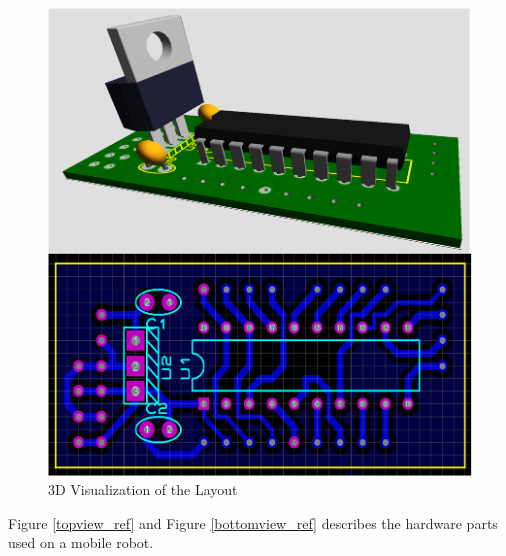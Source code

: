 \begin{figure}[H]
\caption{3D Visualization of the Layout} \label{layout_ref}
\centerline{\includegraphics[scale = 0.60]{sematik-layout}}
\end{figure} 

Figure \ref{topview_ref} and Figure \ref{bottomview_ref} describes the hardware parts used on a mobile robot.

